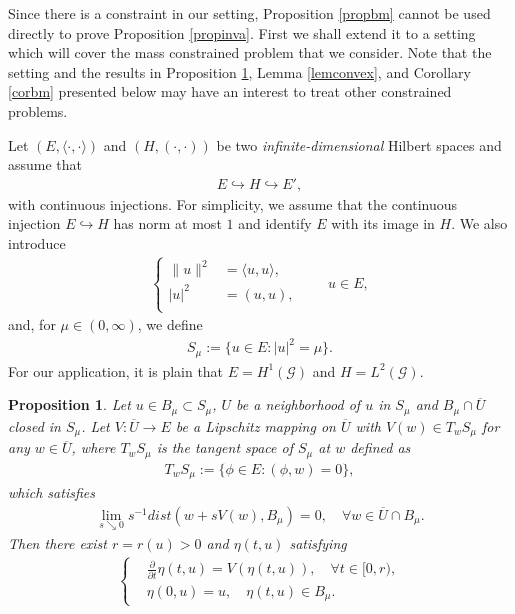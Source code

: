 \documentclass[10pt,a4paper]{article}
\newtheorem{proposition}[theorem]{Proposition}
\theoremstyle{definition} \theoremstyle{remark}
\numberwithin{equation}{section}
\newcommand{\G}{\mathcal{G}}
\begin{document}
Since there is a constraint in our setting, Proposition \ref{propbm} cannot be used directly to prove Proposition \ref{propinva}. First we shall extend it to a setting which will cover the mass constrained problem that we consider. Note that the setting and the results in Proposition \ref{propbmmanifold}, Lemma \ref{lemconvex}, and Corollary \ref{corbm} presented below may have an interest to treat other constrained problems.

Let $(E,\langle \cdot,\cdot\rangle)$ and $(H,( \cdot,\cdot))$ be two \emph{infinite-dimensional} Hilbert spaces and assume that
\begin{align*}
	E \hookrightarrow H \hookrightarrow E',
\end{align*}
with continuous injections. For simplicity, we assume that the continuous injection $E \hookrightarrow H$ has norm at most $1$ and identify $E$ with its image in $H$. We also introduce
\begin{align*}
	\left\{
	\begin{aligned}
		\|u\|^2 & = \langle u,u \rangle, \\
		|u|^2 \ & = (u,u), \\
	\end{aligned}
	\right.
	\quad \quad u \in E,
\end{align*}
and, for $\mu \in (0,\infty)$, we define
\begin{align*}
	S_\mu := \{u \in E: |u|^2 = \mu \}.
\end{align*}
For our application, it is plain that $E = H^1(\G)$ and $H = L^2(\G)$.

\begin{proposition} \label{propbmmanifold}
	Let $u \in B_\mu \subset S_\mu$, $U$ be a neighborhood of $u$ in $S_\mu$ and $B_\mu \cap \overline{U}$ closed in $S_\mu$. Let $V: \overline{U} \to E$ be a Lipschitz mapping on $\overline{U}$ with $V(w) \in T_wS_\mu$ for any $w \in \overline{U}$, where $T_wS_\mu$ is the tangent space of $S_\mu$ at $w$ defined as
	\begin{align*}
		T_wS_\mu := \bigl\{\phi \in E: (\phi,w) = 0\bigr\},
	\end{align*}
    which satisfies
    \begin{align} \label{eqd=0}
    	\lim_{s \searrow 0}s^{-1}dist(w + sV(w),B_\mu) = 0, \quad \forall w \in \overline{U} \cap B_\mu.
    \end{align}
    Then  there exist $r = r(u) > 0$ and $\eta(t,u)$ satisfying 
	\begin{align*} 
		\left\{
			\begin{aligned}
				& \frac{\partial}{\partial t}\eta(t,u) = V(\eta(t,u)), \quad \forall t \in [0,r), \\
				& \eta(0,u) = u, \quad \eta(t,u) \in B_\mu.
			\end{aligned}
		\right.
	\end{align*}
\end{proposition}
\end{document}
